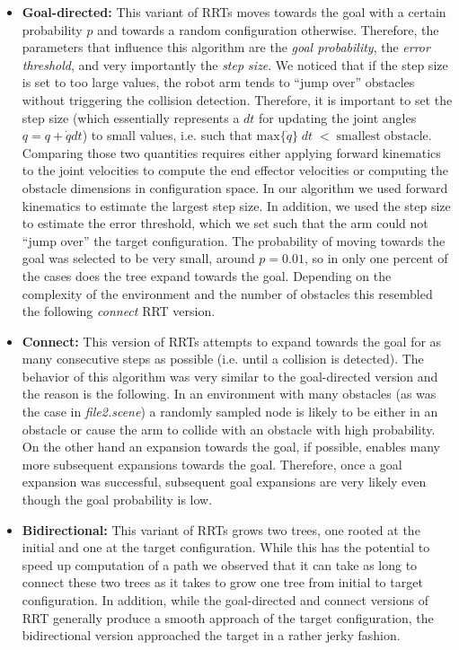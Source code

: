 \documentclass[12pt]{article}
\begin{document}
\begin{itemize}
 \item \textbf{Goal-directed:} This variant of RRTs moves towards the goal with a certain probability $p$ and towards a random configuration otherwise. Therefore, the parameters that influence this algorithm are the \textit{goal probability}, the \textit{error threshold}, and very importantly the \textit{step size}. We noticed that if the step size is set to too large values, the robot arm tends to ``jump over'' obstacles without triggering the collision detection. Therefore, it is important to set the step size (which essentially represents a $dt$ for updating the joint angles $q = q + \dot{q} dt$) to small values, i.e. such that $\mathrm{max}\{ \dot{q} \} \; dt \; < \; \mathrm{smallest} \; \mathrm{obstacle}$. Comparing those two quantities requires either applying forward kinematics to the joint velocities to compute the end effector velocities or computing the obstacle dimensions in configuration space. In our algorithm we used forward kinematics to estimate the largest step size. In addition, we used the 
step size to estimate the error threshold, which we set such that the arm could not ``jump over'' the target configuration. \newline
 The probability of moving towards the goal was selected to be very small, around $p = 0.01$, so in only one percent of the cases does the tree expand towards the goal. Depending on the complexity of the environment and the number of obstacles this resembled the following \textit{connect} RRT version. 
 
 \item \textbf{Connect:} This version of RRTs attempts to expand towards the goal for as many consecutive steps as possible (i.e. until a collision is detected). The behavior of this algorithm was very similar to the goal-directed version and the reason is the following. In an environment with many obstacles (as was the case in \textit{file2.scene}) a randomly sampled node is likely to be either in an obstacle or cause the arm to collide with an obstacle with high probability. On the other hand an expansion towards the goal, if possible, enables many more subsequent expansions towards the goal. Therefore, once a goal expansion was successful, subsequent goal expansions are very likely even though the goal probability is low. 
 
 \item \textbf{Bidirectional:} This variant of RRTs grows two trees, one rooted at the initial and one at the target configuration. While this has the potential to speed up computation of a path we observed that it can take as long to connect these two trees as it takes to grow one tree from initial to target configuration. In addition, while the goal-directed and connect versions of RRT generally produce a smooth approach of the target configuration, the bidirectional version approached the target in a rather jerky fashion. 
\end{itemize}
\end{document}

